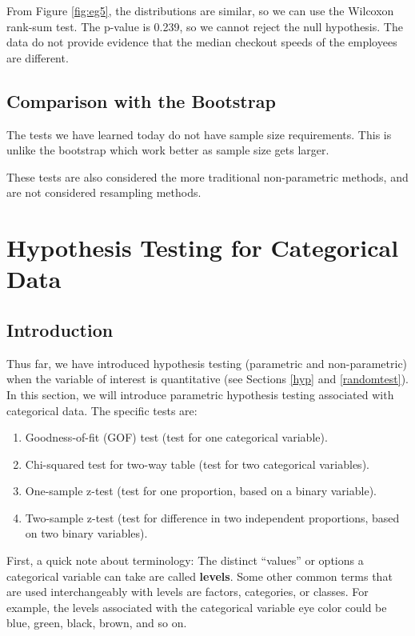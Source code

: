 \documentclass[
]{book}
\providecommand{\tightlist}{%
  \setlength{\itemsep}{0pt}\setlength{\parskip}{0pt}}
\theoremstyle{definition}
\theoremstyle{definition}
\theoremstyle{definition}
\theoremstyle{definition}
\theoremstyle{remark}
\begin{document}
From Figure \ref{fig:eg5}, the distributions are similar, so we can use the Wilcoxon rank-sum test. The p-value is 0.239, so we cannot reject the null hypothesis. The data do not provide evidence that the median checkout speeds of the employees are different.

\hypertarget{comparison-with-the-bootstrap}{%
\section{Comparison with the Bootstrap}\label{comparison-with-the-bootstrap}}

The tests we have learned today do not have sample size requirements. This is unlike the bootstrap which work better as sample size gets larger.

These tests are also considered the more traditional non-parametric methods, and are not considered resampling methods.

\hypertarget{hyp2}{%
\chapter{Hypothesis Testing for Categorical Data}\label{hyp2}}

\hypertarget{introduction-8}{%
\section{Introduction}\label{introduction-8}}

Thus far, we have introduced hypothesis testing (parametric and non-parametric) when the variable of interest is quantitative (see Sections \ref{hyp} and \ref{randomtest}). In this section, we will introduce parametric hypothesis testing associated with categorical data. The specific tests are:

\begin{enumerate}
\def\labelenumi{\arabic{enumi}.}
\tightlist
\item
  Goodness-of-fit (GOF) test (test for one categorical variable).
\item
  Chi-squared test for two-way table (test for two categorical variables).
\item
  One-sample z-test (test for one proportion, based on a binary variable).
\item
  Two-sample z-test (test for difference in two independent proportions, based on two binary variables).
\end{enumerate}

First, a quick note about terminology: The distinct ``values'' or options a categorical variable can take are called \textbf{levels}. Some other common terms that are used interchangeably with levels are factors, categories, or classes. For example, the levels associated with the categorical variable eye color could be blue, green, black, brown, and so on.
\end{document}
